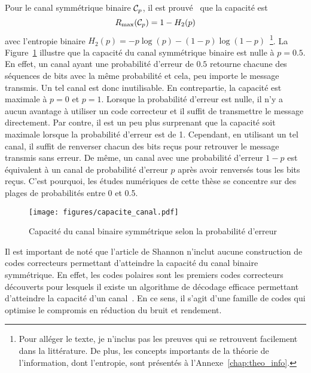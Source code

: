 Pour le canal symmétrique binaire $\mathcal{C}_p$, 
il est prouvé~\cite{shannon_mathematical_1948} que la capacité est 
\begin{equation}
  R_{\text{max}}(\mathcal{C}_p) = 1 - H_2(p)
\end{equation}
avec l'entropie binaire $H_2(p) = -p \log(p) - (1 - p)\log(1 - p)$~\footnote{
  Pour alléger le texte, je n'inclus pas les preuves qui se retrouvent facilement 
  dans la littérature.
  De plus, les concepts importants de la théorie de l'information, dont l'entropie, 
  sont présentés à l'Annexe~\ref{chap:theo_info}.
}. 
La Figure~\ref{fig:capacite_canal} illustre que la capacité du canal symmétrique binaire 
est nulle à $p = 0.5$.
En effet, un canal ayant une probabilité d'erreur de $0.5$ retourne 
chacune des séquences de bits avec la même probabilité 
et cela, peu importe le message transmis.
Un tel canal est donc inutilisable.
En contrepartie, la capacité est maximale à $p = 0$ et $p = 1$.
Lorsque la probabilité d'erreur est nulle,
il n'y a aucun avantage à utiliser un code correcteur 
et il suffit de transmettre le message directement.
Par contre, il est un peu plus surprenant que la capacité soit maximale lorsque la probabilité
d'erreur est de 1.
Cependant, en utilisant un tel canal, 
il suffit de renverser chacun des bits reçus pour retrouver le message transmis sans erreur.
De même, 
un canal avec une probabilité d'erreur $1 - p$ est équivalent à un canal de probabilité d'erreur $p$
après avoir renversés tous les bits reçus.
C'est pourquoi, 
les études numériques de cette thèse se concentre sur des plages de probabilités entre 0 et 0.5.

\begin{figure}
  \begin{center}
    \texttt{[image: figures/capacite\_canal.pdf]}
  \end{center}
  \caption{Capacité du canal binaire symmétrique selon la probabilité d'erreur}
  \label{fig:capacite_canal}
\end{figure}



Il est important de noté que l'article de Shannon n'inclut aucune construction de codes 
correcteurs permettant d'atteindre la capacité du canal binaire symmétrique.
En effet, les codes polaires sont les premiers codes correcteurs découverts 
pour lesquels il existe un algorithme de décodage efficace permettant d'atteindre 
la capacité d'un canal~\cite{arikan_channel_2009}. 
En ce sens, il s'agit d'une famille de codes qui optimise le compromis en réduction du bruit 
et rendement.

